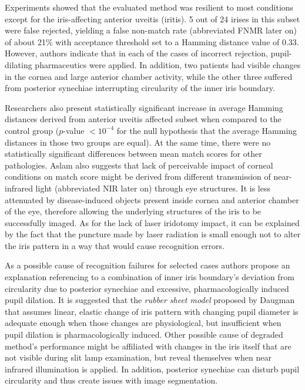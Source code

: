 \documentclass[a4paper]{spie}
\begin{document}
Experiments showed that the evaluated method was resilient to most conditions except for the iris-affecting anterior uveitis (iritis). 5 out of 24 irises in this subset were false rejected, yielding a false non-match rate (abbreviated FNMR later on) of about 21\% with acceptance threshold set to a Hamming distance value of 0.33. However, authors indicate that in each of the cases of incorrect rejection, pupil-dilating pharmaceutics were applied. In addition, two patients had visible changes in the cornea and large anterior chamber activity, while the other three suffered from posterior synechiae interrupting circularity of the inner iris boundary.

Researchers also present statistically significant increase in average Hamming distances derived from anterior uveitis affected subset when compared to the control group ($p$-value $< 10^{-4}$ for the null hypothesis that the average Hamming distances in those two groups are equal). At the same time, there were no statistically significant differences between mean match scores for other pathologies. Aslam also suggests that lack of perceivable impact of corneal conditions on match score might be derived from different transmission of near-infrared light (abbreviated NIR later on) through eye structures. It is less attenuated by disease-induced  objects present inside cornea and anterior chamber of the eye, therefore allowing the underlying structures of the iris to be successfully imaged. As for the lack of laser iridotomy impact, it can be explained by the fact that the puncture made by laser radiation is small enough not to alter the iris pattern in a way that would cause recognition errors. 

As a possible cause of recognition failures for selected cases authors propose an explanation referencing to a combination of inner iris boundary's deviation from circularity due to posterior synechiae and excessive, pharmacologically induced pupil dilation. It is suggested that the \emph{rubber sheet model} proposed by Daugman \cite{DaugmanArticle} that assumes linear, elastic change of iris pattern with changing pupil diameter is adequate enough when those changes are physiological, but insufficient when pupil dilation is pharmacologically induced. Other possible cause of degraded method’s performance might be affiliated with changes in the iris itself that are not visible during slit lamp examination, but reveal themselves when near infrared illumination is applied. In addition, posterior synechiae can disturb pupil circularity and thus create issues with image segmentation.
\end{document}
